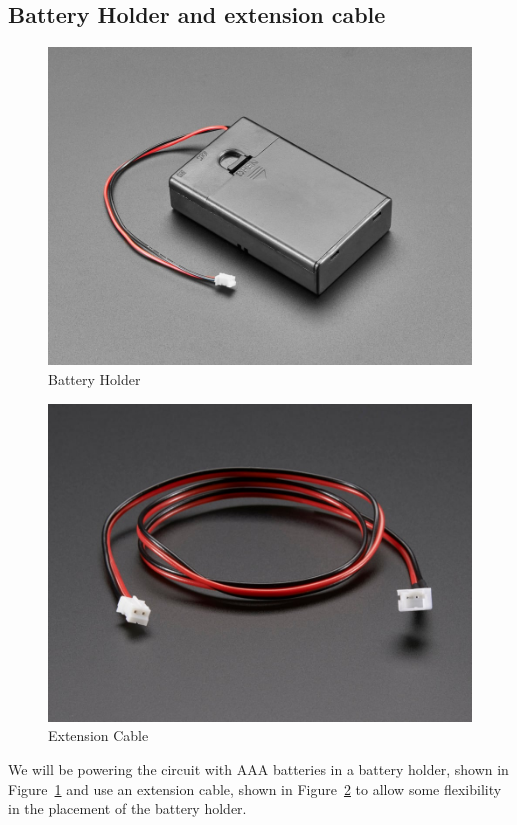 \documentclass[letterpaper,twoside,12pt]{article}
\begin{document}
\subsection{Battery Holder and extension cable}
\begin{figure}[hbpt]\begin{centering}%
\includegraphics[width=5in]{BatteryHolder.jpg}
\caption{Battery Holder}
\label{fig:batteryholder}
\end{centering}\end{figure}
\begin{figure}[hbpt]\begin{centering}%
\includegraphics[width=5in]{ExtenssionCable.jpg}
\caption{Extension Cable}
\label{fig:extenssioncable}
\end{centering}\end{figure}
We will be powering the circuit with AAA batteries in a battery holder, shown 
in Figure~\ref{fig:batteryholder} and use an extension cable, shown in 
Figure~\ref{fig:extenssioncable} to allow some flexibility in the placement of 
the battery holder.
\clearpage
\end{document}
